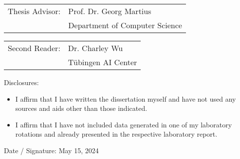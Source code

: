 \begin{titlepage}
    \vspace*{1cm}

    \vfill

    \begin{tabular}{@{}ll}
        Thesis Advisor: \hspace{0.5cm} & Prof. Dr. Georg Martius\\
                        & Department of Computer Science
    \end{tabular}
  
    \vspace{36pt}

    \begin{tabular}{@{}ll}
        Second Reader: \hspace{0.5cm} & Dr. Charley Wu\\
                        & Tübingen AI Center
    \end{tabular}
    
    \vspace{46pt}

    Disclosures:
    \begin{itemize}
        \item I affirm that I have written the dissertation myself and have not used any sources and aids other than those indicated.
        \item I affirm that I have not included data generated in one of my laboratory rotations and already presented in the respective laboratory report.
    \end{itemize}
    
    \vspace{36pt}
    
    Date / Signature: \hspace{0.6cm} May 15, 2024

    \vspace*{1in}
\end{titlepage}